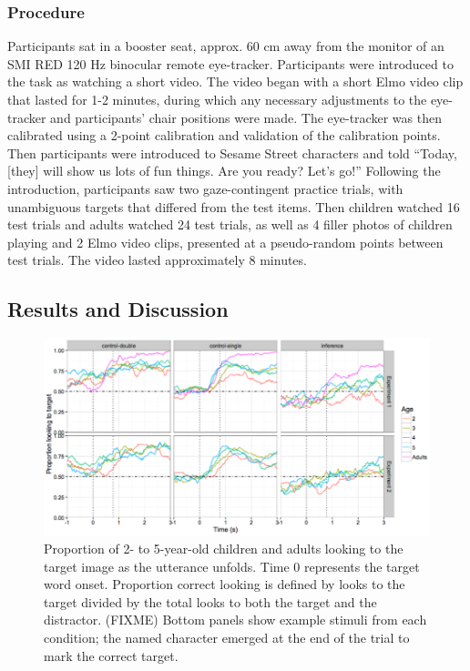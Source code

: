 \documentclass[a4paper,man,apacite,floatsintext]{apa6}
\newenvironment{CodeChunk}{}{}
\begin{document}
\subsubsection{Procedure}\label{procedure}

Participants sat in a booster seat, approx. 60 cm away from the monitor
of an SMI RED 120 Hz binocular remote eye-tracker. Participants were
introduced to the task as watching a short video. The video began with a
short Elmo video clip that lasted for 1-2 minutes, during which any
necessary adjustments to the eye-tracker and participants' chair
positions were made. The eye-tracker was then calibrated using a 2-point
calibration and validation of the calibration points. Then participants
were introduced to Sesame Street characters and told ``Today, {[}they{]}
will show us lots of fun things. Are you ready? Let's go!'' Following
the introduction, participants saw two gaze-contingent practice trials,
with unambiguous targets that differed from the test items. Then
children watched 16 test trials and adults watched 24 test trials, as
well as 4 filler photos of children playing and 2 Elmo video clips,
presented at a pseudo-random points between test trials. The video
lasted approximately 8 minutes.

\subsection{Results and Discussion}\label{results-and-discussion}

\begin{CodeChunk}
\begin{figure}[tb]

{\centering \includegraphics{figs/et_accuracy-1} 

}

\caption[Proportion of 2- to 5-year-old children and adults looking to the target image as the utterance unfolds]{Proportion of 2- to 5-year-old children and adults looking to the target image as the utterance unfolds. Time 0 represents the target word onset. Proportion correct looking is defined by looks to the target divided by the total looks to both the target and the distractor. (FIXME) Bottom panels show example stimuli from each condition; the named character emerged at the end of the trial to mark the correct target.}\label{fig:et_accuracy}
\end{figure}
\end{CodeChunk}
\end{document}
